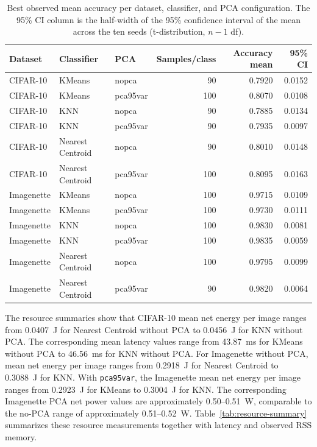 \documentclass[sigconf,review,nonacm]{acmart}
\begin{document}
\begin{table}[t]
  \caption{Best observed mean accuracy per dataset, classifier, and PCA configuration. The 95\% CI column is the half-width of the 95\% confidence interval of the mean across the ten seeds (t-distribution, $n-1$ df).}
  \label{tab:best-accuracy}
  \centering
  \footnotesize
  \begin{tabular}{@{}lllrrr@{}}
    \toprule
    Dataset & Classifier & PCA & Samples/class & Accuracy mean & 95\% CI \\
    \midrule
    CIFAR-10 & KMeans & nopca & 90 & 0.7920 & 0.0152 \\
    CIFAR-10 & KMeans & pca95var & 100 & 0.8070 & 0.0108 \\
    CIFAR-10 & KNN & nopca & 90 & 0.7885 & 0.0134 \\
    CIFAR-10 & KNN & pca95var & 90 & 0.7935 & 0.0097 \\
    CIFAR-10 & Nearest Centroid & nopca & 90 & 0.8010 & 0.0148 \\
    CIFAR-10 & Nearest Centroid & pca95var & 100 & 0.8095 & 0.0163 \\
    Imagenette & KMeans & nopca & 100 & 0.9715 & 0.0109 \\
    Imagenette & KMeans & pca95var & 100 & 0.9730 & 0.0111 \\
    Imagenette & KNN & nopca & 100 & 0.9830 & 0.0081 \\
    Imagenette & KNN & pca95var & 100 & 0.9835 & 0.0059 \\
    Imagenette & Nearest Centroid & nopca & 100 & 0.9795 & 0.0099 \\
    Imagenette & Nearest Centroid & pca95var & 90 & 0.9820 & 0.0064 \\
    \bottomrule
  \end{tabular}
\end{table}

The resource summaries show that CIFAR-10 mean net energy per image ranges from 0.0407~J for Nearest Centroid without PCA to 0.0456~J for KNN without PCA.
The corresponding mean latency values range from 43.87~ms for KMeans without PCA to 46.56~ms for KNN without PCA.
For Imagenette without PCA, mean net energy per image ranges from 0.2918~J for Nearest Centroid to 0.3088~J for KNN.
With \texttt{pca95var}, the Imagenette mean net energy per image ranges from 0.2923~J for KMeans to 0.3004~J for KNN.
The corresponding Imagenette PCA net power values are approximately 0.50--0.51~W, comparable to the no-PCA range of approximately 0.51--0.52~W.
Table~\ref{tab:resource-summary} summarizes these resource measurements together with latency and observed RSS memory.
\end{document}

